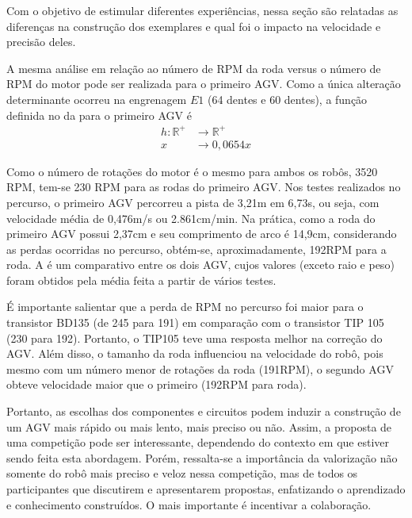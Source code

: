 \documentclass{textolivre-html}
\begin{document}
Com o objetivo de estimular diferentes experiências, nessa seção são relatadas
as diferenças na construção dos exemplares e qual foi o impacto na velocidade e
precisão deles.



A mesma análise em relação ao número de RPM da roda versus o número de RPM do
motor pode ser realizada para o primeiro AGV. Como a única alteração
determinante ocorreu na engrenagem $E1$ (64 dentes e 60 dentes), a função
definida no  da  para o primeiro AGV é 
\begin{align*}
h: \mathbb{R}^{+} &\rightarrow \mathbb{R}^{+} \\
  x &\rightarrow 0,0654 x \nonumber
\end{align*}

Como o número de rotações do motor é o mesmo para ambos os robôs, 3520 RPM,
tem-se 230 RPM para as rodas do primeiro AGV. Nos testes realizados no
percurso, o primeiro AGV percorreu a pista de 3,21m em 6,73s, ou seja, com
velocidade média de 0,476m/s ou 2.861cm/min. Na prática, como a roda do
primeiro AGV possui 2,37cm e seu comprimento de arco é 14,9cm, considerando as
perdas ocorridas no percurso, obtém-se, aproximadamente, 192RPM para a roda. A
 é um comparativo entre os dois AGV, cujos valores (exceto raio e peso)
foram obtidos pela média feita a partir de vários testes.



É importante salientar que a perda de RPM no percurso foi maior para o
transistor BD135 (de 245 para 191) em comparação com o transistor TIP 105 (230
para 192). Portanto, o TIP105 teve uma resposta melhor na correção do AGV. Além
disso, o tamanho da roda influenciou na velocidade do robô, pois mesmo com um
número menor de rotações da roda (191RPM), o segundo AGV obteve velocidade
maior que o primeiro (192RPM para roda).

Portanto, as escolhas dos componentes e circuitos podem induzir a construção de
um AGV mais rápido ou mais lento, mais preciso ou não. Assim, a proposta de uma
competição pode ser interessante, dependendo do contexto em que estiver sendo
feita esta abordagem. Porém, ressalta-se a importância da valorização não
somente do robô mais preciso e veloz nessa competição, mas de todos os
participantes que discutirem e apresentarem propostas, enfatizando o
aprendizado e conhecimento construídos. O mais importante é incentivar a
colaboração.
\end{document}

